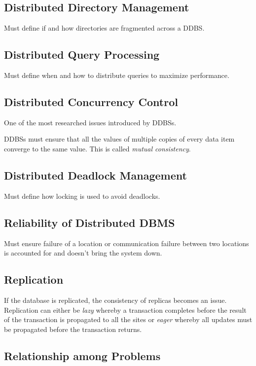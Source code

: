 \documentclass[12pt]{article}
\begin{document}
\subsection{Distributed Directory Management}

Must define if and how directories are fragmented across a DDBS.

\subsection{Distributed Query Processing}

Must define when and how to distribute queries to maximize performance.

\subsection{Distributed Concurrency Control}

One of the most researched issues introduced by DDBSs.

DDBSs must ensure that all the values of multiple copies of every data item converge to the same value. This is called \textit{mutual consistency}.

\subsection{Distributed Deadlock Management}

Must define how locking is used to avoid deadlocks.

\subsection{Reliability of Distributed DBMS}

Must ensure failure of a location or communication failure between two locations is accounted for and doesn't bring the system down.

\subsection{Replication}

If the database is replicated, the consistency of replicas becomes an issue. Replication can either be \textit{lazy} whereby a transaction completes before the result of the transaction is propagated to all the sites or \textit{eager} whereby all updates must be propagated before the transaction returns.

\subsection{Relationship among Problems}
\end{document}
